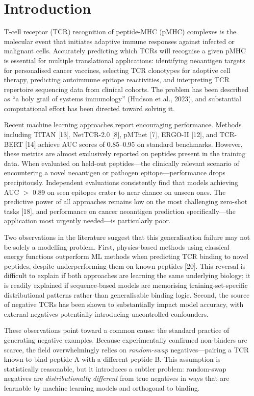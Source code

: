\documentclass[11pt, a4paper]{article}
\begin{document}
\section{Introduction}

T-cell receptor (TCR) recognition of peptide-MHC (pMHC) complexes is the molecular event that initiates adaptive immune responses against infected or malignant cells. Accurately predicting which TCRs will recognise a given pMHC is essential for multiple translational applications: identifying neoantigen targets for personalised cancer vaccines, selecting TCR clonotypes for adoptive cell therapy, predicting autoimmune epitope reactivities, and interpreting TCR repertoire sequencing data from clinical cohorts. The problem has been described as ``a holy grail of systems immunology'' (Hudson et al., 2023), and substantial computational effort has been directed toward solving it.

Recent machine learning approaches report encouraging performance. Methods including TITAN [13], NetTCR-2.0 [8], pMTnet [7], ERGO-II [12], and TCR-BERT [14] achieve AUC scores of 0.85--0.95 on standard benchmarks. However, these metrics are almost exclusively reported on peptides present in the training data. When evaluated on held-out peptides---the clinically relevant scenario of encountering a novel neoantigen or pathogen epitope---performance drops precipitously. Independent evaluations consistently find that models achieving AUC $>$ 0.89 on seen epitopes crater to near chance on unseen ones. The predictive power of all approaches remains low on the most challenging zero-shot tasks [18], and performance on cancer neoantigen prediction specifically---the application most urgently needed---is particularly poor.

Two observations in the literature suggest that this generalisation failure may not be solely a modelling problem. First, physics-based methods using classical energy functions outperform ML methods when predicting TCR binding to novel peptides, despite underperforming them on known peptides [20]. This reversal is difficult to explain if both approaches are learning the same underlying biology; it is readily explained if sequence-based models are memorising training-set-specific distributional patterns rather than generalisable binding logic. Second, the source of negative TCRs has been shown to substantially impact model accuracy, with external negatives potentially introducing uncontrolled confounders.

These observations point toward a common cause: the standard practice of generating negative examples. Because experimentally confirmed non-binders are scarce, the field overwhelmingly relies on \textit{random-swap} negatives---pairing a TCR known to bind peptide A with a different peptide B. This assumption is statistically reasonable, but it introduces a subtler problem: random-swap negatives are \textit{distributionally different} from true negatives in ways that are learnable by machine learning models and orthogonal to binding.
\end{document}
